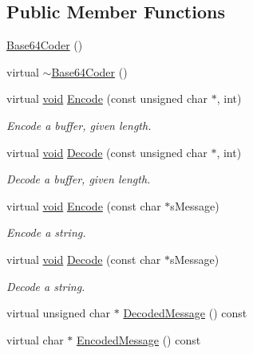 \subsection*{\-Public \-Member \-Functions}
\begin{DoxyCompactItemize}
\item 
\hyperlink{class_base64_coder_afdb24cf364c7fa026b7c3f56b6d425ed}{\-Base64\-Coder} ()
\item 
virtual \hyperlink{class_base64_coder_a8dadb735570ffcc6af8274c3ea6f6b94}{$\sim$\-Base64\-Coder} ()
\item 
virtual \hyperlink{_cpclient_8h_a6464f7480a0fd0ee170cba12b2c0497f}{void} \hyperlink{class_base64_coder_aa8343de3fa88497b5d5ecda89e112939}{\-Encode} (const unsigned char $\ast$, int)
\begin{DoxyCompactList}\small\item\em \-Encode a buffer, given length. \end{DoxyCompactList}\item 
virtual \hyperlink{_cpclient_8h_a6464f7480a0fd0ee170cba12b2c0497f}{void} \hyperlink{class_base64_coder_a04b9debcf2cb14ed762163516ab490e7}{\-Decode} (const unsigned char $\ast$, int)
\begin{DoxyCompactList}\small\item\em \-Decode a buffer, given length. \end{DoxyCompactList}\item 
virtual \hyperlink{_cpclient_8h_a6464f7480a0fd0ee170cba12b2c0497f}{void} \hyperlink{class_base64_coder_ae17c300b87ee92c9d4e7efee23cd67cb}{\-Encode} (const char $\ast$s\-Message)
\begin{DoxyCompactList}\small\item\em \-Encode a string. \end{DoxyCompactList}\item 
virtual \hyperlink{_cpclient_8h_a6464f7480a0fd0ee170cba12b2c0497f}{void} \hyperlink{class_base64_coder_aa2a021c1e68e63239d9d9a514ede36c4}{\-Decode} (const char $\ast$s\-Message)
\begin{DoxyCompactList}\small\item\em \-Decode a string. \end{DoxyCompactList}\item 
virtual unsigned char $\ast$ \hyperlink{class_base64_coder_a352c8253107d1bda61641cbdc5a18e48}{\-Decoded\-Message} () const 
\item 
virtual char $\ast$ \hyperlink{class_base64_coder_a996897850a667bac903210cb66fb8874}{\-Encoded\-Message} () const 

\end{DoxyCompactItemize}

